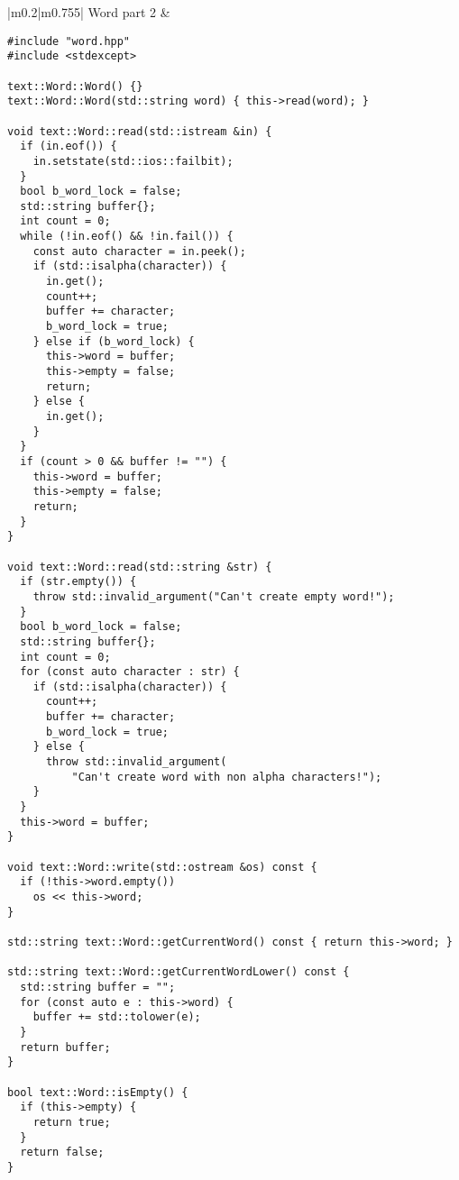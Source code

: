\documentclass[main.tex,fontsize=8pt,paper=a4,paper=portrait,DIV=calc,]{scrartcl}
\begin{document}
\begin{table}[ht!]
\begin{tabular}{|m{0.2\linewidth}|m{0.755\linewidth}|}
\hline
Word part 2 & 
\vspace{2mm}
\begin{lstlisting}
#include "word.hpp"
#include <stdexcept>

text::Word::Word() {}
text::Word::Word(std::string word) { this->read(word); }

void text::Word::read(std::istream &in) {
  if (in.eof()) {
    in.setstate(std::ios::failbit);
  }
  bool b_word_lock = false;
  std::string buffer{};
  int count = 0;
  while (!in.eof() && !in.fail()) {
    const auto character = in.peek();
    if (std::isalpha(character)) {
      in.get();
      count++;
      buffer += character;
      b_word_lock = true;
    } else if (b_word_lock) {
      this->word = buffer;
      this->empty = false;
      return;
    } else {
      in.get();
    }
  }
  if (count > 0 && buffer != "") {
    this->word = buffer;
    this->empty = false;
    return;
  }
}

void text::Word::read(std::string &str) {
  if (str.empty()) {
    throw std::invalid_argument("Can't create empty word!");
  }
  bool b_word_lock = false;
  std::string buffer{};
  int count = 0;
  for (const auto character : str) {
    if (std::isalpha(character)) {
      count++;
      buffer += character;
      b_word_lock = true;
    } else {
      throw std::invalid_argument(
          "Can't create word with non alpha characters!");
    }
  }
  this->word = buffer;
}

void text::Word::write(std::ostream &os) const {
  if (!this->word.empty())
    os << this->word;
}

std::string text::Word::getCurrentWord() const { return this->word; }

std::string text::Word::getCurrentWordLower() const {
  std::string buffer = "";
  for (const auto e : this->word) {
    buffer += std::tolower(e);
  }
  return buffer;
}

bool text::Word::isEmpty() {
  if (this->empty) {
    return true;
  }
  return false;
}
\end{lstlisting}
\\
\hline
\end{tabular}
\end{table}
\pagebreak
\end{document}
